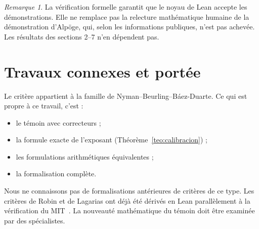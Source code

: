 \documentclass[11pt,a4paper]{amsart}
\theoremstyle{definition}
\theoremstyle{remark}
\newtheorem{observacion}[teorema]{Remarque}
\begin{document}
\begin{observacion}
La v\'erification formelle garantit que le noyau de Lean accepte les d\'emonstrations. Elle ne remplace pas la relecture math\'ematique humaine de la d\'emonstration d'Alp\"oge, qui, selon les informations publiques, n'est pas achev\'ee. Les r\'esultats des sections 2--7 n'en d\'ependent pas.
\end{observacion}

\section{Travaux connexes et port\'ee}

Le crit\`ere appartient \`a la famille de Nyman--Beurling--B\'aez-Duarte. Ce qui est propre \`a ce travail, c'est :
\begin{itemize}
\item le t\'emoin avec correcteurs ;
\item la formule exacte de l'exposant (Th\'eor\`eme~\ref{teo:calibracion}) ;
\item les formulations arithm\'etiques \'equivalentes ;
\item la formalisation compl\`ete.
\end{itemize}
Nous ne connaissons pas de formalisations ant\'erieures de crit\`eres de ce type. Les crit\`eres de Robin et de Lagarias ont d\'ej\`a \'et\'e d\'eriv\'es en Lean parall\`element \`a la v\'erification du MIT~\cite{MIT}. La nouveaut\'e math\'ematique du t\'emoin doit \^etre examin\'ee par des sp\'ecialistes.
\end{document}
